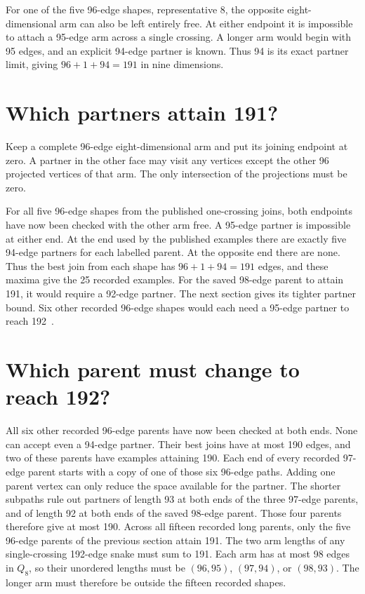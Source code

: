 \documentclass[11pt,a4paper]{article}
\begin{document}
For one of the five 96-edge shapes, representative 8, the opposite
eight-dimensional arm can also be left entirely free. At either endpoint
it is impossible to attach a 95-edge arm across a single crossing. A
longer arm would begin with 95 edges, and an explicit 94-edge partner
is known. Thus 94 is its exact partner limit, giving \(96+1+94=191\)
in nine dimensions.

\section{Which partners attain 191?}

Keep a complete 96-edge eight-dimensional arm and put its joining
endpoint at zero. A partner in the other face may visit any vertices
except the other 96 projected vertices of that arm. The only
intersection of the projections must be zero.

For all five 96-edge shapes from the published one-crossing joins, both endpoints have now been
checked with the other arm free. A 95-edge partner is impossible
at either end. At the end used by the published examples there are
exactly five 94-edge partners for each labelled parent. At the opposite
end there are none. Thus the best join from each shape has
\(96+1+94=191\) edges, and these maxima give the 25 recorded examples.
For the saved 98-edge parent to attain 191, it would require a
92-edge partner. The next section gives its tighter partner bound.
Six other recorded 96-edge shapes would each need a 95-edge partner
to reach 192~\cite{root248}.

\section{Which parent must change to reach 192?}

All six other recorded 96-edge parents have now been checked at both
ends. None can accept even a 94-edge partner. Their best joins have
at most 190 edges, and two of these parents have examples attaining
190. Each end of every recorded 97-edge parent starts with a copy of
one of those six 96-edge paths. Adding one parent vertex can only
reduce the space available for the partner. The shorter subpaths
rule out partners of length 93 at both ends of the three 97-edge
parents, and of length 92 at both ends of the saved 98-edge parent.
Those four parents therefore give at most 190. Across all fifteen
recorded long parents, only the five 96-edge parents of the previous
section attain 191. The two arm lengths of any single-crossing
192-edge snake must sum to 191. Each arm has at most 98 edges in
$Q_8$, so their unordered lengths must be $(96,95)$, $(97,94)$,
or $(98,93)$. The longer arm must therefore be outside the fifteen
recorded shapes.
\end{document}
